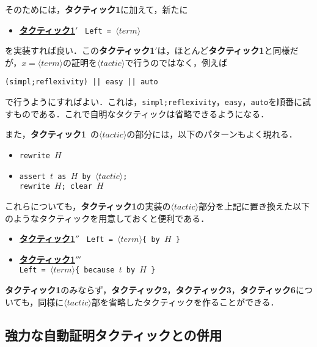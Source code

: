 \documentclass[submit]{ipsj}
\begin{document}
そのためには，{\gtfamily\bfseries タクティック1}に加えて，新たに
\begin{itemize}
\item \underline{\gtfamily\bfseries タクティック1$'$}~ \label{tactic1'} \verb+Left = +$\langle\mathit{term}\rangle$
\end{itemize}
を実装すれば良い．この{\gtfamily\bfseries タクティック1$'$}は，ほとんど{\gtfamily\bfseries タクティック1}と同様だが，$x = \langle\mathit{term}\rangle$の証明を$\langle\mathit{tactic}\rangle$で行うのではなく，例えば
\begin{mdframed}[leftmargin=10pt, rightmargin=10pt, skipabove=10pt, skipbelow=10pt]
\begin{verbatim}
(simpl;reflexivity) || easy || auto
\end{verbatim}
\end{mdframed}
で行うようにすればよい．これは，\verb+simpl;reflexivity+，\verb+easy+，\verb+auto+を順番に試すものである．これで自明なタクティックは省略できるようになる．

また，{\gtfamily\bfseries タクティック1}~の$\langle\mathit{tactic}\rangle$の部分には，以下のパターンもよく現れる．
\begin{itemize}
\item \verb+rewrite +$H$
\item \verb+assert +$t$\verb+ as +$H$\verb+ by +$\langle\mathit{tactic}\rangle$\verb+;+\\
\verb+rewrite +$H$\verb+; clear +$H$
\end{itemize}
これらについても，{\gtfamily\bfseries タクティック1}の実装の$\langle\mathit{tactic}\rangle$部分を上記に置き換えた以下のようなタクティックを用意しておくと便利である．
\begin{itemize}
\item \underline{\gtfamily\bfseries タクティック1$''$}~ \verb+Left = +$ \langle\mathit{term}\rangle$\verb+{ by +$H$\verb+ }+
\item \underline{\gtfamily\bfseries タクティック1$'''$}~\\\quad  \verb+Left = +$ \langle\mathit{term}\rangle$\verb+{ because +$t$\verb+ by +$H$\verb+ }+
\end{itemize}

{\gtfamily\bfseries タクティック1}のみならず，{\gtfamily\bfseries タクティック2}，{\gtfamily\bfseries タクティック3}，{\gtfamily\bfseries タクティック6}についても，同様に$\langle\mathit{tactic}\rangle$部を省略したタクティックを作ることができる．


\subsection{強力な自動証明タクティックとの併用}
\end{document}
